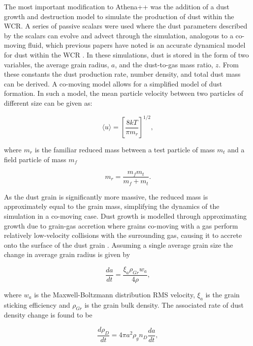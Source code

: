 The most important modification to Athena++ was the addition of a dust growth and destruction model to simulate the production of dust within the WCR.
A series of passive scalars were used where the dust parameters described by the scalars can evolve and advect through the simulation, analogous to a co-moving fluid, which previous papers have noted is an accurate dynamical model for dust within the WCR \parencite{hendrix_pinwheels_2016}.
In these simulations, dust is stored in the form of two variables, the average grain radius, $a$, and the dust-to-gas mass ratio, $z$.
From these constants the dust production rate, number density, and total dust mass can be derived.
A co-moving model allows for a simplified model of dust formation. In such a model, the mean particle velocity between two particles of different size can be given as:

\begin{equation}
  \langle u \rangle = \left[ \frac{8kT}{\pi m_r} \right] ^{1/2} ,
\end{equation}

\noindent
where $m_r$ is the familiar reduced mass between a test particle of mass $m_t$ and a field particle of mass $m_f$

\begin{equation}
  m_r = \frac{m_f m_t}{m_f + m_t} .
\end{equation}

\noindent
As the dust grain is significantly more massive, the reduced mass is approximately equal to the grain mass, simplifying the dynamics of the simulation in a co-moving case.
Dust growth is modelled through approximating growth due to grain-gas accretion where grains co-moving with a gas perform relatively low-velocity collisions with the surrounding gas, causing it to accrete onto the surface of the dust grain \parencite{spitzerPhysicalProcessesInterstellar2008}.
Assuming a single average grain size the change in average grain radius is given by

\begin{equation}
  \frac{da}{dt} = \frac{\xi_a \rho_{Gr} w_a}{4 \rho} ,
\end{equation}

\noindent
where $w_a$ is the Maxwell-Boltzmann distribution RMS velocity, $\xi_a$ is the grain sticking efficiency and $\rho_{Gr}$ is the grain bulk density.
The associated rate of dust density change is found to be

\begin{equation}
  \frac{d\rho_D}{dt}  = 4 \pi a^2 \rho_g n_D \frac{da}{dt} , 
\end{equation}

